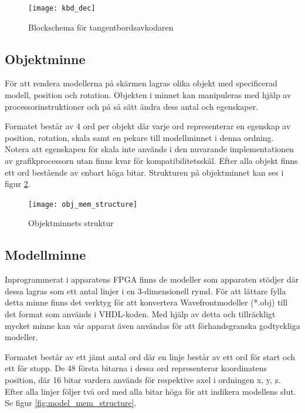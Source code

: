 \documentclass[a4paper]{article}
\begin{document}
    \begin{figure}[H]
        \centering
        \texttt{[image: kbd\_dec]}
        \caption{Blockschema för tangentbordsavkodaren}
        \label{fig:kbd_dec}
    \end{figure}

    \subsection{Objektminne}

    För att rendera modellerna på skärmen lagras olika objekt med specificerad
    modell, position och rotation. Objekten i minnet kan manipuleras med hjälp av
    processorinstruktioner och på så sätt ändra dess antal och egenskaper. 

    Formatet består av 4 ord per objekt där varje ord representerar en egenskap av
    position, rotation, skala samt en pekare till modellminnet i denna ordning.
    Notera att egenskapen för skala inte används i den nuvarande implementationen av
    grafikprocessorn utan finns kvar för kompatibilitetsskäl. Efter alla objekt
    finns ett ord bestående av enbart höga bitar. Strukturen på objektminnet kan ses
    i figur \ref{fig:obj_mem_structure}. 

    \begin{figure}[H]
        \centering
        \texttt{[image: obj\_mem\_structure]}
        \caption{Objektminnets struktur}
        \label{fig:obj_mem_structure}
    \end{figure}

    \subsection{Modellminne}
    Inprogrammerat i apparatens FPGA finns de modeller som apparaten stödjer där dessa lagras som
    ett antal linjer i en 3-dimensionell rymd. För att lättare fylla detta minne finns det verktyg
    för att konvertera Wavefrontmodeller (*.obj) till det format som används i VHDL-koden. Med 
    hjälp av detta och tillräckligt mycket minne kan vår apparat även användas för att
    förhandsgranska godtyckliga modeller.

    Formatet består av ett jämt antal ord där en linje består av ett ord för start och ett för
    stopp. De 48 första bitarna i dessa ord representerar koordinatens position, där 16 bitar
    vardera används för respektive axel i ordningen x, y, z. Efter alla linjer följer två ord med 
    alla bitar höga för att indikera modellens slut. Se figur \ref{fig:model_mem_structure}.
\end{document}
